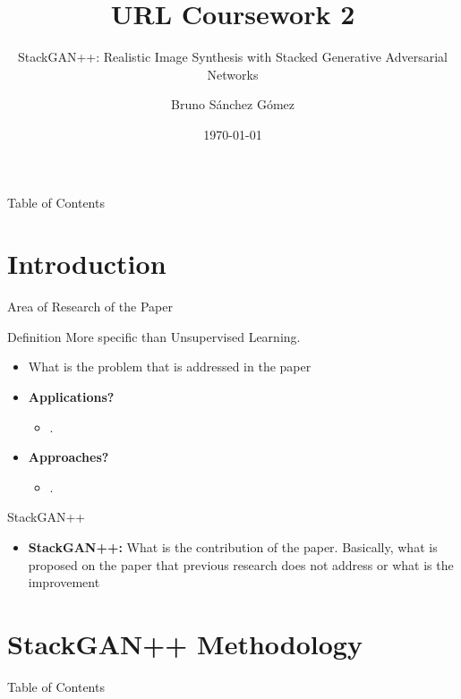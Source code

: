 \documentclass[pdf]{beamer}
\title{URL Coursework 2}
\subtitle{StackGAN++: Realistic Image Synthesis with Stacked Generative Adversarial Networks}
\author{Bruno Sánchez Gómez}
\date{\today}
\begin{document}
\begin{frame}
    \titlepage
\end{frame}


\begin{frame}{Table of Contents}
    \tableofcontents
\end{frame}

\section{Introduction}

\begin{frame}{Area of Research of the Paper}
    \centering
    \begin{minipage}{0.8\textwidth}
        \begin{block}{Definition}
            \centering
            More specific than Unsupervised Learning.
        \end{block}
    \end{minipage}
    \vspace{0.5cm}
    \begin{itemize}
        \item What is the problem that is addressed in the paper
        \item \textbf{Applications?}
            \begin{itemize}
                \item .
            \end{itemize}
        \item \textbf{Approaches?}
            \begin{itemize}
                \item .
            \end{itemize}
    \end{itemize}
\end{frame}

\begin{frame}{StackGAN++~\cite{stackgan++}}
    \begin{itemize}
        \item \textbf{StackGAN++:} What is the contribution of the paper. Basically, what is proposed on the paper that previous research does not address or what is the improvement
    \end{itemize}
\end{frame}

\section{StackGAN++ Methodology}
\begin{frame}{Table of Contents}
    \tableofcontents[currentsection]
\end{frame}
\end{document}
